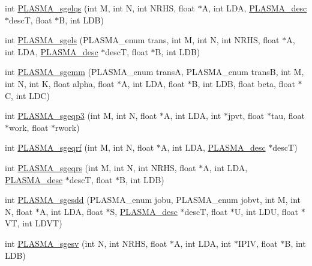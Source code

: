 \begin{DoxyCompactItemize}
\item 
int \hyperlink{group__float_ga4bde040498b35dcbc88268de59de7d12_ga4bde040498b35dcbc88268de59de7d12}{P\+L\+A\+S\+M\+A\+\_\+sgelqs} (int M, int N, int N\+R\+H\+S, float $\ast$A, int L\+D\+A, \hyperlink{structplasma__desc__t}{P\+L\+A\+S\+M\+A\+\_\+desc} $\ast$desc\+T, float $\ast$B, int L\+D\+B)
\item 
int \hyperlink{group__float_ga2bbab59e86acca698a73c5bc8023e5c3_ga2bbab59e86acca698a73c5bc8023e5c3}{P\+L\+A\+S\+M\+A\+\_\+sgels} (P\+L\+A\+S\+M\+A\+\_\+enum trans, int M, int N, int N\+R\+H\+S, float $\ast$A, int L\+D\+A, \hyperlink{structplasma__desc__t}{P\+L\+A\+S\+M\+A\+\_\+desc} $\ast$desc\+T, float $\ast$B, int L\+D\+B)
\item 
int \hyperlink{group__float_gace4e6452ba3ffb8cef11be1987091382_gace4e6452ba3ffb8cef11be1987091382}{P\+L\+A\+S\+M\+A\+\_\+sgemm} (P\+L\+A\+S\+M\+A\+\_\+enum trans\+A, P\+L\+A\+S\+M\+A\+\_\+enum trans\+B, int M, int N, int K, float alpha, float $\ast$A, int L\+D\+A, float $\ast$B, int L\+D\+B, float beta, float $\ast$C, int L\+D\+C)
\item 
int \hyperlink{group__float_ga06922daf59255d12c1fc228cecd6aaa0_ga06922daf59255d12c1fc228cecd6aaa0}{P\+L\+A\+S\+M\+A\+\_\+sgeqp3} (int M, int N, float $\ast$A, int L\+D\+A, int $\ast$jpvt, float $\ast$tau, float $\ast$work, float $\ast$rwork)
\item 
int \hyperlink{group__float_gad2dff40bb75ba6ee7a91306e0a3e889e_gad2dff40bb75ba6ee7a91306e0a3e889e}{P\+L\+A\+S\+M\+A\+\_\+sgeqrf} (int M, int N, float $\ast$A, int L\+D\+A, \hyperlink{structplasma__desc__t}{P\+L\+A\+S\+M\+A\+\_\+desc} $\ast$desc\+T)
\item 
int \hyperlink{group__float_ga15cad3c163c8d1137d13d66594652b7d_ga15cad3c163c8d1137d13d66594652b7d}{P\+L\+A\+S\+M\+A\+\_\+sgeqrs} (int M, int N, int N\+R\+H\+S, float $\ast$A, int L\+D\+A, \hyperlink{structplasma__desc__t}{P\+L\+A\+S\+M\+A\+\_\+desc} $\ast$desc\+T, float $\ast$B, int L\+D\+B)
\item 
int \hyperlink{group__float_gad5f1778952268ef575d41e6bfcc7c7b4_gad5f1778952268ef575d41e6bfcc7c7b4}{P\+L\+A\+S\+M\+A\+\_\+sgesdd} (P\+L\+A\+S\+M\+A\+\_\+enum jobu, P\+L\+A\+S\+M\+A\+\_\+enum jobvt, int M, int N, float $\ast$A, int L\+D\+A, float $\ast$S, \hyperlink{structplasma__desc__t}{P\+L\+A\+S\+M\+A\+\_\+desc} $\ast$desc\+T, float $\ast$U, int L\+D\+U, float $\ast$V\+T, int L\+D\+V\+T)
\item 
int \hyperlink{group__float_ga39018420f926f77ef11c50c82f66da77_ga39018420f926f77ef11c50c82f66da77}{P\+L\+A\+S\+M\+A\+\_\+sgesv} (int N, int N\+R\+H\+S, float $\ast$A, int L\+D\+A, int $\ast$I\+P\+I\+V, float $\ast$B, int L\+D\+B)

\end{DoxyCompactItemize}
